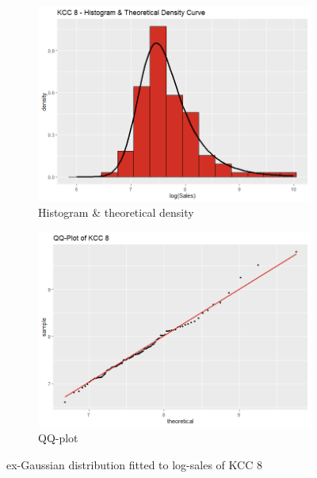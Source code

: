  \begin{figure}[H]
\centering
\begin{subfigure}{.45\textwidth}
  \centering
  \includegraphics[width=\linewidth]{figures/kcc_8_density.png}
  \caption{Histogram \& theoretical density}
  \label{fig:kcc_8_density}
\end{subfigure}
\begin{subfigure}{.45\textwidth}
  \centering
  \includegraphics[width=\linewidth]{figures/kcc_8_qqplot.png}
  \caption{QQ-plot}
  \label{fig:kcc_8_qqplot}
\end{subfigure}
\caption{ex-Gaussian distribution fitted to log-sales of \ac{KCC} 8}
\label{fig:kcc_8_margin}
\end{figure} 


